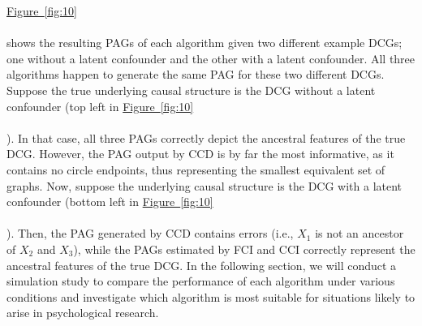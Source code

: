 \documentclass[twoside, 11pt]{article}
\newcommand*{\figref}[2][]{%
  \hyperref[{fig:#2}]{%
    Figure~\ref*{fig:#2}%
    \ifx\\#1\\%
    \else
      #1%
    \fi
  }%
}
\begin{document}
\figref[]{10} shows the resulting PAGs of each algorithm given two different example DCGs; one without a latent confounder and the other with a latent confounder. All three algorithms happen to generate the same PAG for these two different DCGs. Suppose the true underlying causal structure is the DCG without a latent confounder (top left in \figref[]{10}). In that case, all three PAGs correctly depict the ancestral features of the true DCG. However, the PAG output by CCD is by far the most informative, as it contains no circle endpoints, thus representing the smallest equivalent set of graphs. Now, suppose the underlying causal structure is the DCG with a latent confounder (bottom left in \figref[]{10}). Then, the PAG generated by CCD contains errors (i.e., $X_1$ is not an ancestor of $X_2$ and $X_3$), while the PAGs estimated by FCI and CCI correctly represent the ancestral features of the true DCG. In the following section, we will conduct a simulation study to compare the performance of each algorithm under various conditions and investigate which algorithm is most suitable for situations likely to arise in psychological research.



\end{document}
